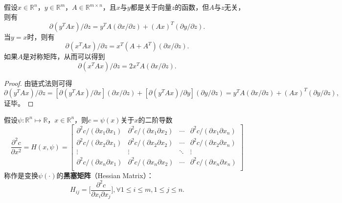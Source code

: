 \begin{proposition}
假设$x\in \mathbb R^n$，$y\in \mathbb R^m$，$A\in \mathbb R^{m\times n}$，且$x$与$y$都是关于向量$z$的函数，但$A$与$z$无关，则有
\begin{equation}
    \partial (y^T A x)/\partial z = y^T A (\partial x/\partial z) + (Ax)^T (\partial y/\partial z).
\end{equation}
当$y=x$时，则有
\begin{equation}
    \partial (x^T A x)/\partial z=x^T(A + A^T) (\partial x/\partial z).
\end{equation}
如果$A$是对称矩阵，从而可以得到
\begin{equation}
    \partial (x^T A x)/\partial z=2x^T A (\partial x/\partial z).
\end{equation}
\end{proposition}
\begin{proof}
由链式法则可得
\[
    \partial (y^T A x)/\partial z = [\partial (y^T A x)/\partial x](\partial x/\partial z) + [\partial (y^T A x)/\partial y](\partial y/\partial z) = y^T A (\partial x/\partial z) + (Ax)^T (\partial y/\partial z),
\]
证毕。
\end{proof}

\begin{definition}
假设$\psi:\mathbb R^n \mapsto \mathbb R$，$x\in \mathbb R^n$，则$c = \psi(x)$关于$x$的二阶导数
\begin{equation}
    \frac{\partial^2 c}{\partial x^2} = H(x,\psi)=
    \begin{bmatrix}
        \partial^2 c/(\partial x_1\partial x_1) & \partial^2 c/(\partial x_1\partial x_2) & \cdots & \partial^2 c/(\partial x_1\partial x_n)\\
        \partial^2 c/(\partial x_2\partial x_1) & \partial^2 c/(\partial x_2\partial x_2) & \cdots & \partial^2 c/(\partial x_2\partial x_n)\\
        \vdots & \vdots & \ddots & \vdots\\
        \partial^2 c/(\partial x_n\partial x_1) & \partial^2 c/(\partial x_n\partial x_2) & \cdots & \partial^2 c/(\partial x_n\partial x_n)\\
    \end{bmatrix}
\end{equation}
称作是变换$\psi(\cdot)$的\textbf{黑塞矩阵}（Hessian Matrix）：
\begin{equation}
    H_{ij} = \Bigg[\frac{\partial^2 c}{\partial x_i \partial x_j}\Bigg], \forall 1\le i \le m, 1\le j \le n.
\end{equation}
\end{definition}

